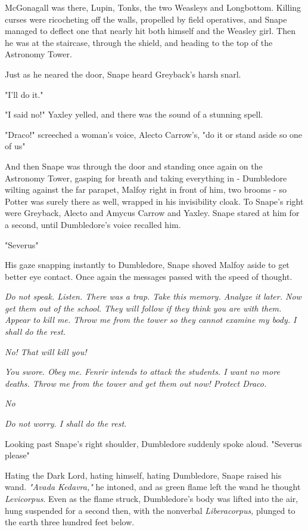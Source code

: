 McGonagall was there, Lupin, Tonks, the two Weasleys and Longbottom. Killing curses were ricocheting off the walls, propelled by field operatives, and Snape managed to deflect one that nearly hit both himself and the Weasley girl. Then he was at the staircase, through the shield, and heading to the top of the Astronomy Tower.

Just as he neared the door, Snape heard Greyback's harsh snarl.

"I'll do it."

"I said no!" Yaxley yelled, and there was the sound of a stunning spell.

"Draco!" screeched a woman's voice, Alecto Carrow's, "do it or stand aside so one of us{\el}"

And then Snape was through the door and standing once again on the Astronomy Tower, gasping for breath and taking everything in - Dumbledore wilting against the far parapet, Malfoy right in front of him, two brooms - so Potter was surely there as well, wrapped in his invisibility cloak. To Snape's right were Greyback, Alecto and Amycus Carrow and{\el} Yaxley. Snape stared at him for a second, until Dumbledore's voice recalled him.

"Severus{\el}"

His gaze snapping instantly to Dumbledore, Snape shoved Malfoy aside to get better eye contact. Once again the messages passed with the speed of thought.

\emph{Do not speak. Listen. There was a trap. Take this memory. Analyze it later. Now get them out of the school. They will follow if they think you are with them. Appear to kill me. Throw me from the tower so they cannot examine my body. I shall do the rest.}

\emph{No! That will kill you!}

\emph{You swore. Obey me. Fenrir intends to attack the students. I want no more deaths. Throw me from the tower and get them out now! Protect Draco.}

\emph{No{\el}}

\emph{Do not worry. I shall do the rest.}

Looking past Snape's right shoulder, Dumbledore suddenly spoke aloud. "Severus{\el} please{\el}"

Hating the Dark Lord, hating himself, hating Dumbledore, Snape raised his wand. \emph{"Avada Kedavra,"} he intoned, and as green flame left the wand he thought \emph{Levicorpus}. Even as the flame struck, Dumbledore's body was lifted into the air, hung suspended for a second then, with the nonverbal \emph{Liberacorpus,} plunged to the earth three hundred feet below.

